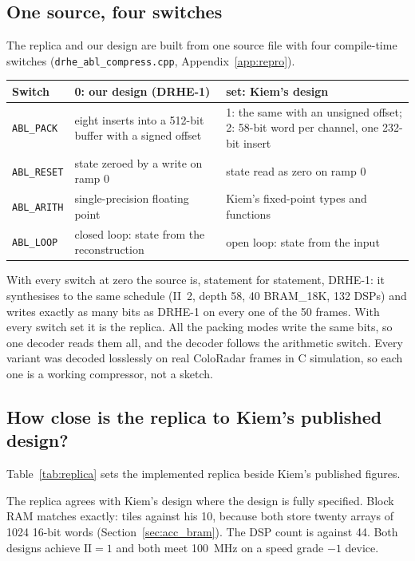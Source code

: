 \subsection{One source, four switches}

The replica and our design are built from one source file with four
compile-time switches (\texttt{drhe\_abl\_compress.cpp}, Appendix~\ref{app:repro}).

\begin{center}
\small
\begin{tabular}{@{}lp{}p{}@{}}
\toprule
Switch & 0: our design (DRHE-1) & set: Kiem's design\\
\midrule
\texttt{ABL\_PACK}  & eight inserts into a 512-bit buffer with a signed offset &
1: the same with an unsigned offset; 2: 58-bit word per channel, one 232-bit
insert\\
\texttt{ABL\_RESET} & state zeroed by a write on ramp 0 & state read as zero on ramp 0\\
\texttt{ABL\_ARITH} & single-precision floating point & Kiem's fixed-point types and functions\\
\texttt{ABL\_LOOP}  & closed loop: state from the reconstruction & open loop: state from the input\\
\bottomrule
\end{tabular}
\end{center}

\noindent
With every switch at zero the source is, statement for statement, DRHE-1: it
synthesises to the same schedule (II~2, depth 58, 40 BRAM\_18K, 132 DSPs) and
writes exactly as many bits as DRHE-1 on every one of the 50 frames. With
every switch set it is the replica. All the packing modes write the same bits, so one decoder reads them all, and the decoder follows the arithmetic
switch. Every variant was decoded losslessly on real ColoRadar frames in C
simulation, so each one is a working compressor, not a sketch.

\subsection{How close is the replica to Kiem's published design?}
\label{sec:replicaval}

Table~\ref{tab:replica} sets the implemented replica beside Kiem's published
figures.



The replica agrees with Kiem's design where the design is fully specified.
Block RAM matches exactly:  tiles against his 10, because both
store twenty arrays of \num{1024} 16-bit words (Section~\ref{sec:acc_bram}). The
DSP count is  against 44. Both designs achieve $\mathrm{II} = 1$
and both meet \SI{100}{\mega\hertz} on a speed grade $-1$ device.

